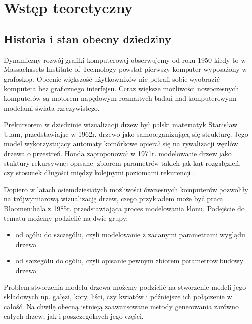\chapter{Wstęp teoretyczny}



\section{Historia i stan obecny dziedziny}
Dynamiczny rozwój grafiki komputerowej obserwujemy od roku 1950 kiedy to w Massachusets Institute of Technology \cite{jankowski} powstał pierwszy
komputer wyposażony w grafoskop. Obecnie większość użytkowników nie potrafi sobie wyobrazić komputera bez graficznego interfejsu.
Coraz większe możliwości nowoczesnych komputerów są motorem napędowym rozmaitych badań nad komputerowymi modelami świata rzeczywistego.

Prekursorem w dziedzinie wizualizacji drzew był polski matematyk Stanisław Ulam, przedstawiając w 1962r. \cite{ulam} drzewo jako samoorganizującą się
strukturę. Jego model wykorzystujący automaty komórkowe opierał się na rywalizacji węzłów  drzewa o przestreń.
Honda zaproponował w 1971r. modelowanie drzew jako stuktury rekursywnej opisanej
zbiorem parametrów takich jak kąt rozgałęzień, czy stosunek długości między kolejnymi poziomami rekurencji \cite{honda}.

Dopiero w latach osiemdziesiatych
możliwości ówczesnych komputerów pozwoliły na trójwymiarową wizualizację drzew, czego przykładem może być praca Bloomenthala z 1985r. \cite{bloomenthal}
przedstawiająca proces modelowania klonu. Podejście do tematu możemy podzielić na dwie grupy:
\begin{itemize}
\item od ogółu do szczegółu, czyli modelowanie z zadanymi parametrami wyglądu drzewa
\item od szczegółu do ogółu, czyli opisanie pewnym zbiorem parametrów budowy drzewa
\end{itemize}
Problem stworzenia modelu drzewa możemy podzielić na stworzenie modeli jego składowych np. gałęzi, kory, liści, czy kwiatów i późniejsze
ich połączenie w całość. Na chwilę obecną istnieją zaawansowane metody generowania zarówno całych drzew, jak i poszczególnych jego części.

